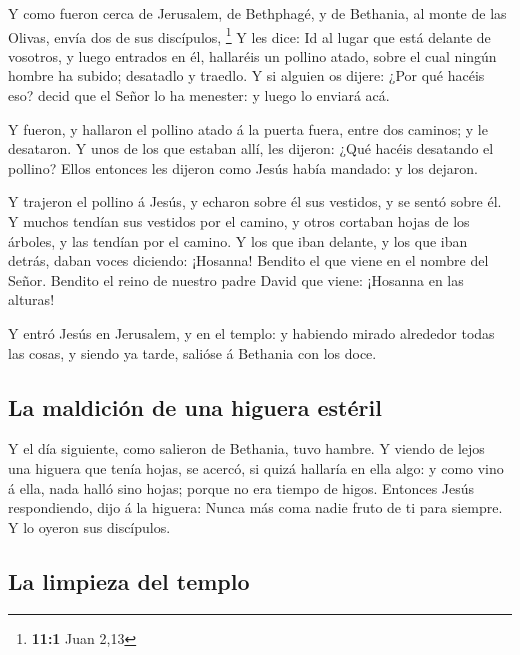  Y como fueron cerca de Jerusalem, de Bethphagé, y de
Bethania, al monte de las Olivas, envía dos de sus discípulos,
\footnote{\textbf{11:1} Juan 2,13}  Y les dice: Id al
lugar que está delante de vosotros, y luego entrados en él, hallaréis un
pollino atado, sobre el cual ningún hombre ha subido; desatadlo y
traedlo.  Y si alguien os dijere: ¿Por qué hacéis eso?
decid que el Señor lo ha menester: y luego lo enviará acá.

 Y fueron, y hallaron el pollino atado á la puerta fuera,
entre dos caminos; y le desataron.  Y unos de los que
estaban allí, les dijeron: ¿Qué hacéis desatando el pollino?
 Ellos entonces les dijeron como Jesús había mandado: y
los dejaron.

 Y trajeron el pollino á Jesús, y echaron sobre él sus
vestidos, y se sentó sobre él.  Y muchos tendían sus
vestidos por el camino, y otros cortaban hojas de los árboles, y las
tendían por el camino.  Y los que iban delante, y los que
iban detrás, daban voces diciendo: ¡Hosanna! Bendito el que viene en el
nombre del Señor.  Bendito el reino de nuestro padre
David que viene: ¡Hosanna en las alturas!

 Y entró Jesús en Jerusalem, y en el templo: y habiendo
mirado alrededor todas las cosas, y siendo ya tarde, salióse á Bethania
con los doce.

\hypertarget{la-maldiciuxf3n-de-una-higuera-estuxe9ril}{%
\subsection{La maldición de una higuera
estéril}\label{la-maldiciuxf3n-de-una-higuera-estuxe9ril}}

 Y el día siguiente, como salieron de Bethania, tuvo
hambre.  Y viendo de lejos una higuera que tenía hojas,
se acercó, si quizá hallaría en ella algo: y como vino á ella, nada
halló sino hojas; porque no era tiempo de higos. 
Entonces Jesús respondiendo, dijo á la higuera: Nunca más coma nadie
fruto de ti para siempre. Y lo oyeron sus discípulos.

\hypertarget{la-limpieza-del-templo}{%
\subsection{La limpieza del templo}\label{la-limpieza-del-templo}}

